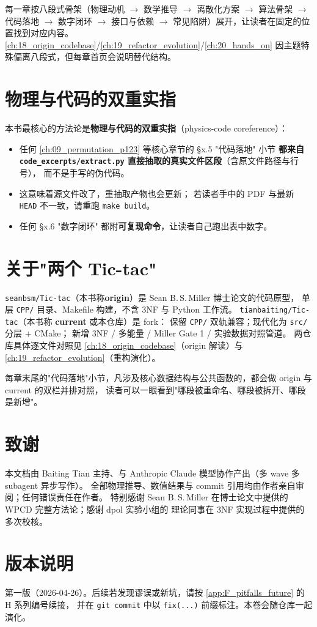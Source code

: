 每一章按八段式骨架（物理动机 \(\to\) 数学推导 \(\to\) 离散化方案 \(\to\) 算法骨架 \(\to\) 代码落地 \(\to\) 数字闭环 \(\to\) 接口与依赖 \(\to\) 常见陷阱）展开，让读者在固定的位置找到对应内容。
\cref{ch:18_origin_codebase}/\cref{ch:19_refactor_evolution}/\cref{ch:20_hands_on} 因主题特殊偏离八段式，但每章首页会说明替代结构。

\section*{物理与代码的双重实指}

本书最核心的方法论是\textbf{物理与代码的双重实指}（physics-code coreference）：

\begin{itemize}
  \item 任何 \cref{ch:09_permutation_p123} 等核心章节的 §x.5 "代码落地" 小节
        \textbf{都来自 \texttt{code\_excerpts/extract.py} 直接抽取的真实文件区段}（含原文件路径与行号），
        而不是手写的伪代码。
  \item 这意味着源文件改了，重抽取产物也会更新；
        若读者手中的 PDF 与最新 \texttt{HEAD} 不一致，请重跑 \texttt{make build}。
  \item 任何 §x.6 "数字闭环" 都附\textbf{可复现命令}，让读者自己跑出表中数字。
\end{itemize}

\section*{关于"两个 Tic-tac"}

\texttt{seanbsm/Tic-tac}（本书称\textbf{origin}）是 Sean B.\,S.\,Miller 博士论文的代码原型，
单层 \texttt{CPP/} 目录、Makefile 构建，不含 3NF 与 Python 工作流。
\texttt{tianbaiting/Tic-tac}（本书称 \textbf{current} 或本仓库）是 fork：
保留 \texttt{CPP/} 双轨兼容；现代化为 \texttt{src/} 分层 + CMake；
新增 3NF / 多能量 / Miller Gate 1 / 实验数据对照管道。
两仓库具体逐文件对照见 \cref{ch:18_origin_codebase}（origin 解读）与 \cref{ch:19_refactor_evolution}（重构演化）。

每章末尾的"代码落地"小节，凡涉及核心数据结构与公共函数的，都会做 origin 与 current 的双栏并排对照，
读者可以一眼看到"哪段被重命名、哪段被拆开、哪段是新增"。

\section*{致谢}

本文档由 Baiting Tian 主持、与 Anthropic Claude 模型协作产出（多 wave 多 subagent 异步写作）。
全部物理推导、数值结果与 commit 引用均由作者亲自审阅；任何错误责任在作者。
特别感谢 Sean B.\,S.\,Miller 在博士论文中提供的 WPCD 完整方法论；感谢 dpol 实验小组的
理论同事在 3NF 实现过程中提供的多次校核。

\section*{版本说明}

第一版（2026-04-26）。后续若发现谬误或新坑，请按 \cref{app:F_pitfalls_future} 的 H 系列编号续接，
并在 \texttt{git commit} 中以 \texttt{fix(...)} 前缀标注。本卷会随仓库一起演化。
